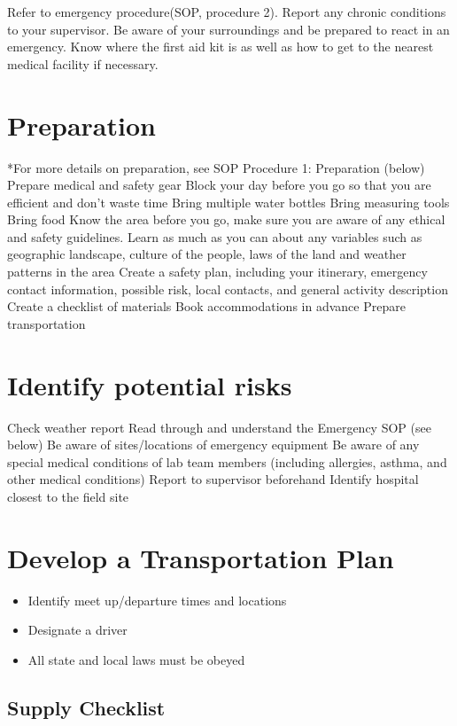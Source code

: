 \documentclass[12pt]{../SOP3_beta}\usepackage[]{graphicx}\usepackage[]{color}
\begin{document}
Refer to emergency procedure(SOP, procedure 2).
Report any chronic conditions to your supervisor.
Be aware of your surroundings and be prepared to react in an emergency.
Know where the first aid kit is as well as how to get to the nearest medical facility if necessary. 


\section{Preparation}

*For more details on preparation, see SOP Procedure 1: Preparation (below)
Prepare medical and safety gear 
Block your day before you go so that you are efficient and don't waste time
Bring multiple water bottles
Bring measuring tools
Bring food
Know the area before you go, make sure you are aware of any ethical and safety guidelines. Learn as much as you can about any variables such as geographic landscape, culture of the people, laws of the land and weather patterns in the area
Create a safety plan, including your itinerary, emergency contact information, possible risk, local contacts, and general activity description 
Create a checklist of materials 
Book accommodations in advance
Prepare transportation

\section{Identify potential risks}


Check weather report
Read through and understand the Emergency SOP (see below)
Be aware of sites/locations of emergency equipment
Be aware of any special medical conditions of lab team members (including allergies, asthma, and other medical conditions)
Report to supervisor beforehand
Identify hospital closest to the field site


\section{Develop a Transportation Plan}

\begin{itemize}
  \item Identify meet up/departure times and locations
  \item Designate a driver
  \item All state and local laws must be obeyed
\end{itemize}

\subsection{Supply Checklist}
\end{document}
